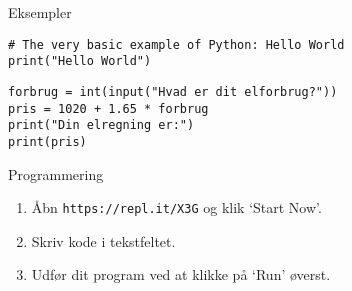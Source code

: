 \documentclass[10pt]{beamer}
\begin{document}
\begin{frame}[fragile]{Eksempler}
	\begin{lstlisting}[style=python]
# The very basic example of Python: Hello World
print("Hello World")
	\end{lstlisting}
	\medskip
	\begin{lstlisting}[style=python]
forbrug = int(input("Hvad er dit elforbrug?"))
pris = 1020 + 1.65 * forbrug
print("Din elregning er:")
print(pris)
	\end{lstlisting}
\end{frame}


\begin{frame}{Programmering}

\begin{enumerate}
\item \alert{Åbn} \texttt{https://repl.it/X3G} og klik `Start Now'.
\item \alert{Skriv} kode i tekstfeltet.
\item \alert{Udfør} dit program ved at klikke på `Run' øverst.
\end{enumerate}
\end{frame}

\end{document}
